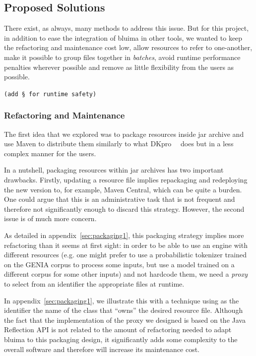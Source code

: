 \documentclass{article}
\newcommand{\TODO}[1]{\texttt{\textcolor{YellowOrange}{(#1)}}} %
\begin{document}
\subsection{Proposed Solutions}

There exist, as always, many methods to address this issue. But for this project, in addition to
ease the integration of bluima in other tools, we wanted to keep the refactoring and maintenance
cost low, allow resources to refer to one-another, make it possible to group files together in
\emph{batches}, avoid runtime performance penalties wherever possible and remove as little
flexibility from the users as possible.

\TODO{add § for runtime safety}

\subsubsection{Refactoring and Maintenance}

The first idea that we explored was to package resources inside jar archive and use Maven to
distribute them similarly to what DKpro~\cite{dkpro}~\cite{dkpro_2014} does but in a less complex
manner for the users.

In a nutshell, packaging resources within jar archives has two important drawbacks. Firstly,
updating a resource file implies repackaging and redeploying the new version to, for example, Maven
Central, which can be quite a burden. One could argue that this is an administrative task that is
not frequent and therefore not significantly enough to discard this strategy. However, the second
issue is of much more concern.

As detailed in appendix~\ref{sec:packaging1}, this packaging strategy implies more refactoring than
it seems at first sight: in order to be able to use an engine with different resources (e.g. one
might prefer to use a probabilistic tokenizer trained on the GENIA corpus to process some inputs,
but use a model trained on a different corpus for some other inputs) and not hardcode them, we need
a \emph{proxy} to select from an identifier the appropriate files at runtime.

In appendix~\ref{sec:packaging1}, we illustrate this with a technique using as the identifier the
name of the class that ``owns'' the desired resource file. Although the fact that the implementation
of the proxy we designed is based on the Java Reflection API is not related to the amount of
refactoring needed to adapt bluima to this packaging design, it significantly adds some complexity
to the overall software and therefore will increase its maintenance cost.
\end{document}
